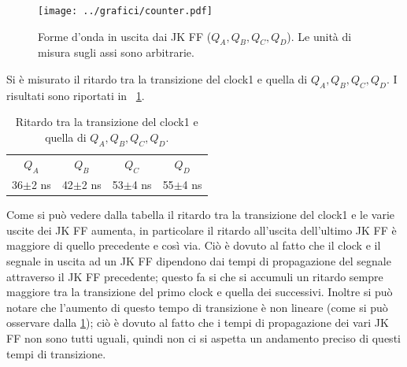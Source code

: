 \documentclass[a4paper,10pt]{article}
\begin{document}
\begin{figure}[H]
	\centering
	\texttt{[image: ../grafici/counter.pdf]}
	\caption{Forme d'onda in uscita dai JK FF ($Q_A,Q_B,Q_C,Q_D$). Le unità di misura sugli assi sono arbitrarie.}
	\label{fig:divisor}
\end{figure}



Si è misurato il ritardo tra la transizione del clock1 e quella di $Q_A,Q_B,Q_C,Q_D$. I risultati sono riportati in \tablename{~\ref{tab:time}}.

\begin{table}[H]
	\centering
	\begin{tabular}{cccc}
\hline
$Q_A$ & $Q_B$ & $Q_C$ & $Q_D$ \\
36$\pm$2 ns & 42$\pm$2 ns & 53$\pm$4 ns & 55$\pm$4 ns \\
\hline
	\end{tabular}
	\caption{Ritardo tra la transizione del clock1 e quella di $Q_A,Q_B,Q_C,Q_D$.}
	\label{tab:time}
\end{table}

Come si può vedere dalla tabella il ritardo tra la transizione del clock1 e le varie uscite dei JK FF aumenta, in particolare il ritardo all'uscita dell'ultimo JK FF è maggiore di quello precedente e così via. Ciò è dovuto al fatto che il clock e il segnale in uscita ad un JK FF dipendono dai tempi di propagazione del segnale attraverso il JK FF precedente; questo fa si che si accumuli un ritardo sempre maggiore tra la transizione del primo clock e quella dei successivi. Inoltre si può notare che l'aumento di questo tempo di transizione è non lineare (come si può osservare dalla \cref{tab:time}); ciò è dovuto al fatto che i tempi di propagazione dei vari JK FF non sono tutti uguali, quindi non ci si aspetta un andamento preciso di questi tempi di transizione. 
\end{document}
